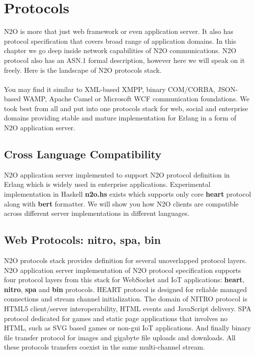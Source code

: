 \section{Protocols}
N2O is more that just web framework or even application server.
It also has protocol specification that covers broad range of application domains.
In this chapter we go deep inside network capabilities of N2O communications.
N2O protocol also has an ASN.1 formal description, however here we will speak on it freely.
Here is the landscape of N2O protocols stack.


\paragraph{}
You may find it similar to XML-based XMPP, binary COM/CORBA,
JSON-based WAMP, Apache Camel or Microsoft WCF communication foundations.
We took best from all and put into one protocols stack for web,
social and enterprise domains providing stable and mature implementation for Erlang
in a form of N2O application server.

\newpage
\subsection*{Cross Language Compatibility}
N2O application server implemented to support N2O protocol definition
in Erlang which is widely used in enterprise applications.
Experimental implementation in Haskell {\bf n2o.hs} exists
which supports only core {\bf heart} protocol along with {\bf bert} formatter.
We will show you how N2O clients are compatible across
different server implementations in different languages.

\subsection*{Web Protocols: {\bf nitro}, {\bf spa}, {\bf bin}}
N2O protocols stack provides definition for several unoverlapped protocol layers.
N2O application server implementation of N2O protocol specification supports
four protocol layers from this stack for WebSocket and IoT applications:
{\bf heart}, {\bf nitro}, {\bf spa} and {\bf bin} protocols.
HEART protocol is designed for reliable managed connections and stream channel initialization.
The domain of NITRO protocol is HTML5 client/server interoperability, HTML events and JavaScript delivery.
SPA protocol dedicated for games and static page applications that involves no HTML,
such as SVG based games or non-gui IoT applications.
And finally binary file transfer protocol for images and gigabyte file uploads and downloads.
All these protocols transfers coexist in the same multi-channel stream.

